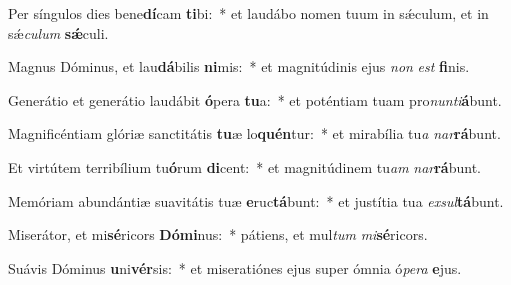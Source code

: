 \item Per síngulos dies bene\textbf{dí}cam \textbf{ti}bi:~* et laudábo nomen tuum in sǽculum, et in sǽ\textit{cu}\textit{lum} \textbf{sǽ}culi.
\item Magnus Dóminus, et lau\textbf{dá}bilis \textbf{ni}mis:~* et magnitúdinis ejus \textit{non} \textit{est} \textbf{fi}nis.
\item Generátio et generátio laudábit \textbf{ó}pera \textbf{tu}a:~* et poténtiam tuam pro\textit{nun}\textit{ti}\textbf{á}bunt.
\item Magnificéntiam glóriæ sanctitátis \textbf{tu}æ lo\textbf{quén}tur:~* et mirabília tu\textit{a} \textit{nar}\textbf{rá}bunt.
\item Et virtútem terribílium tu\textbf{ó}rum \textbf{di}cent:~* et magnitúdinem tu\textit{am} \textit{nar}\textbf{rá}bunt.
\item Memóriam abundántiæ suavitátis tuæ \textbf{e}ruc\textbf{tá}bunt:~* et justítia tua \textit{ex}\textit{sul}\textbf{tá}bunt.
\item Miserátor, et mi\textbf{sé}ricors \textbf{Dó}\textbf{mi}nus:~* pátiens, et mul\textit{tum} \textit{mi}\textbf{sé}ricors.
\item Suávis Dóminus \textbf{u}ni\textbf{vér}sis:~* et miseratiónes ejus super ómnia ó\textit{pe}\textit{ra} \textbf{e}jus.
